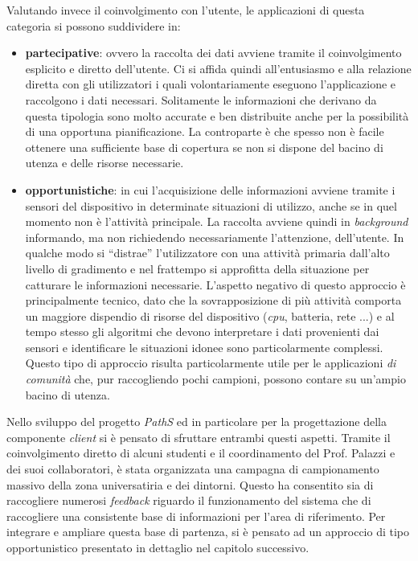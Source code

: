 \documentclass[a4paper, 12pt, twoside, openright]{book}
\begin{document}
Valutando invece il coinvolgimento con l'utente, le applicazioni di questa categoria si possono suddividere in:
\begin{itemize}
  \item \textbf{partecipative}: ovvero la raccolta dei dati avviene tramite il coinvolgimento esplicito e diretto dell'utente. Ci si affida quindi all'entusiasmo e alla relazione diretta con gli utilizzatori i quali volontariamente eseguono l'applicazione e raccolgono i dati necessari. Solitamente le informazioni che derivano da questa tipologia sono molto accurate e ben distribuite anche per la possibilità di una opportuna pianificazione. La controparte è che spesso non è facile ottenere una sufficiente base di copertura se non si dispone del bacino di utenza e delle risorse necessarie. 
  \item \textbf{opportunistiche}: in cui l'acquisizione delle informazioni avviene tramite i sensori del dispositivo in determinate situazioni di utilizzo, anche se in quel momento non è l'attività principale. La raccolta avviene quindi in \emph{background} informando, ma non richiedendo necessariamente l'attenzione, dell'utente. In qualche modo si ``distrae'' l'utilizzatore con una attività primaria dall'alto livello di gradimento e nel frattempo si approfitta della situazione per catturare le informazioni necessarie. L'aspetto negativo di questo approccio è principalmente tecnico, dato che la sovrapposizione di più attività comporta un maggiore dispendio di risorse del dispositivo (\emph{cpu}, batteria, rete ...) e al tempo stesso gli algoritmi che devono interpretare i dati provenienti dai sensori e identificare le situazioni idonee sono particolarmente complessi. Questo tipo di approccio risulta particolarmente utile per le applicazioni \emph{di comunità} che, pur raccogliendo pochi campioni, possono contare su un'ampio bacino di utenza.
\end{itemize}
Nello sviluppo del progetto \emph{PathS} ed in particolare per la progettazione della componente \emph{client} si è pensato di sfruttare entrambi questi aspetti. Tramite il coinvolgimento diretto di alcuni studenti e il coordinamento del Prof. Palazzi e dei suoi collaboratori, è stata organizzata una campagna di campionamento massivo della zona universatiria e dei dintorni. Questo ha consentito sia di raccogliere numerosi \emph{feedback} riguardo il funzionamento del sistema che di raccogliere una consistente base di informazioni per l'area di riferimento. Per integrare e ampliare questa base di partenza, si è pensato ad un approccio di tipo opportunistico presentato in dettaglio nel capitolo successivo.
\end{document}

